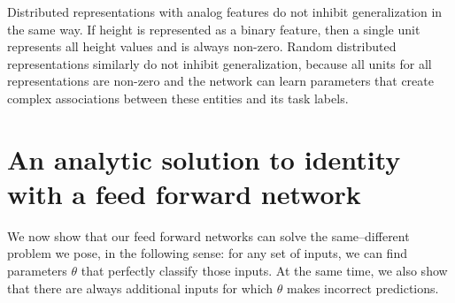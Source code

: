 Distributed representations with analog features do not inhibit generalization in the same way. If height is represented as a binary feature, then a single unit represents all height values and is always non-zero. Random distributed representations similarly do not inhibit generalization, because all units for all representations are non-zero and the network can learn parameters that create complex associations between these entities and its task labels.


\section{An analytic solution to identity with a feed forward network}\label{app:equality-solution}

We now show that our feed forward networks can solve the same--different problem we pose, in the following sense: for any set of inputs, we can find parameters $\theta$ that perfectly classify those inputs. At the same time, we also show that there are always additional inputs for which $\theta$ makes incorrect predictions.

